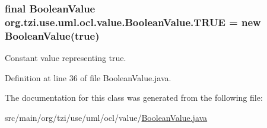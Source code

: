 \hypertarget{classorg_1_1tzi_1_1use_1_1uml_1_1ocl_1_1value_1_1_boolean_value_af6f04be4c101d8fbd7e82d27ac69ebba}{
\subsubsection[{T\-R\-U\-E}]{\setlength{\rightskip}{0pt plus 5cm}final {\bf Boolean\-Value} org.\-tzi.\-use.\-uml.\-ocl.\-value.\-Boolean\-Value.\-T\-R\-U\-E = new {\bf Boolean\-Value}(true)\hspace{0.3cm}{\ttfamily [static]}}}\label{classorg_1_1tzi_1_1use_1_1uml_1_1ocl_1_1value_1_1_boolean_value_af6f04be4c101d8fbd7e82d27ac69ebba}
Constant value representing true. 

Definition at line 36 of file Boolean\-Value.\-java.



The documentation for this class was generated from the following file\-:\begin{DoxyCompactItemize}
\item 
src/main/org/tzi/use/uml/ocl/value/\hyperlink{_boolean_value_8java}{Boolean\-Value.\-java}\end{DoxyCompactItemize}

